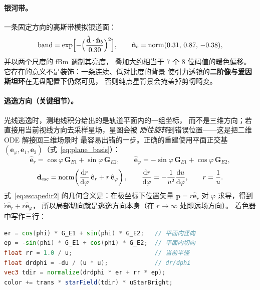 \paragraph{银河带。}
一条固定方向的高斯带模拟银道面：
\[
\mathrm{band}=\exp\Bigl[-\Bigl(\frac{\hat{\mathbf{d}}\cdot\hat{\mathbf{n}}_{b}}{0.30}\Bigr)^{2}\Bigr],
\qquad
\hat{\mathbf{n}}_{b}=\operatorname{norm}(0.31,\,0.87,\,-0.38),
\]
并以两个尺度的 fBm 调制其亮度，
叠加大约相当于 $7$ 个 8 位码值的暖色偏移。
它存在的意义不是装饰：一条连续、低对比度的背景
使引力透镜的\textbf{二阶像与爱因斯坦环}在无盘配置下仍然可见，
否则纯点星背景会掩盖掉剪切畸变。

\paragraph{逃逸方向（关键细节）。}
光线逃逸时，测地线积分给出的是轨道平面内的一组坐标，
而不是三维方向；若直接用当前视线方向去采样星场，星图会被
\emph{刚性旋转}到错误位置——这是把二维 ODE 解接回三维场景时
最容易出错的一步。正确的重建使用平面正交基
$(\mathbf{e}_{\varphi},\mathbf{e}_1,\mathbf{e}_2)$（式~\eqref{eq:plane_basis}）：
\begin{equation}
\hat{\mathbf{e}}_r=\cos\varphi\,\mathbf{G}_{E1}+\sin\varphi\,\mathbf{G}_{E2},
\qquad
\hat{\mathbf{e}}_\varphi=-\sin\varphi\,\mathbf{G}_{E1}+\cos\varphi\,\mathbf{G}_{E2},
\label{eq:escapedir}
\end{equation}
\begin{equation}
\mathbf{d}_{\rm esc}
=\operatorname{norm}\!\left(\frac{\mathrm{d} r}{\mathrm{d}\varphi}\,\hat{\mathbf{e}}_r
+r\,\hat{\mathbf{e}}_\varphi\right),
\qquad
\frac{\mathrm{d} r}{\mathrm{d}\varphi}=-\frac{1}{u^{2}}\frac{\mathrm{d} u}{\mathrm{d}\varphi},
\qquad r=\frac1u .
\label{eq:escapedir2}
\end{equation}
式~\eqref{eq:escapedir2} 的几何含义是：在极坐标下位置矢量
$\mathbf{p}=r\hat{\mathbf{e}}_r$ 对 $\varphi$ 求导，得到
$\dot r\hat{\mathbf{e}}_r+r\hat{\mathbf{e}}_\varphi$，
所以局部切向就是逃逸方向本身（在 $r\to\infty$ 处即远场方向）。
着色器中写作三行：

\begin{lstlisting}[language=GLSL, caption={逃逸方向重建与星场采样（shaders.js 节选）}, label={lst:escape}]
er = cos(phi) * G_E1 + sin(phi) * G_E2;   // 平面内径向
ep = -sin(phi) * G_E1 + cos(phi) * G_E2;  // 平面内切向
float rr = 1.0 / u;                       // 当前半径
float drdphi = -du / (u * u);             // dr/dphi
vec3 tdir = normalize(drdphi * er + rr * ep);
color += trans * starField(tdir) * uStarBright;
\end{lstlisting}

